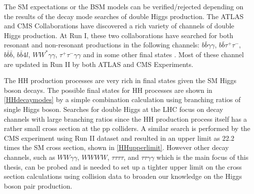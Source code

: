 The SM expectations or the BSM models can be verified/rejected depending on the results of the decay mode searches of double Higgs production. The ATLAS and CMS Collaborations have discovered a rich variety of channels of double Higgs production. At Run I, these two collaborations have searched for both resonant and non-resonant productions in the following channels: $b\bar b\gamma\gamma$, $b\bar b\tau^+\tau^-$, $b\bar b\bar b$, $b\bar b4l$, $WW^*\gamma\gamma$, $\tau^+\tau^-\gamma\gamma$ and in some other final states \cite{pdg}. Most of these channel are updated in Run II by both ATLAS\cite{Aad2020} and CMS\cite{Sirunyan2019} Experiments.

The HH production processes are very rich in final states given the SM Higgs boson decays. The possible final states for HH processes are shown in \autoref{HHdecaymodes} by a simple combination calculation using branching ratios of single Higgs boson. Searches for double Higgs at the LHC focus on decay channels with large branching ratios since the HH production process itself has a rather small cross section at the pp colliders. A similar search is performed by the CMS experiment using Run II dataset and resulted in an upper limit as 22.2 times the SM cross section, shown in \autoref{HHupperlimit}. However other decay channels, such as $WW\gamma\gamma$, $WWWW$, $\tau\tau\tau\tau$, and $\tau\tau\gamma\gamma$ which is the main focus of this thesis, can be probed and is needed to set up a tighter upper limit on the cross section calculations using collision data to broaden our knowledge on the Higgs boson pair production. 

